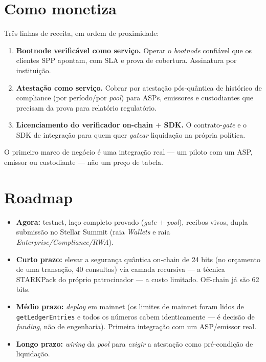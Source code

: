 \documentclass[11pt]{article}
\newcommand{\code}[1]{\texttt{\small #1}}
\begin{document}
\section{Como monetiza}

Três linhas de receita, em ordem de proximidade:

\begin{enumerate}[leftmargin=1.6em]
\item \textbf{Bootnode verificável como serviço.} Operar o \emph{bootnode}
confiável que os clientes SPP apontam, com SLA e prova de cobertura. Assinatura
por instituição.
\item \textbf{Atestação como serviço.} Cobrar por atestação pós-quântica de
histórico de compliance (por período/por \emph{pool}) para ASPs, emissores e
custodiantes que precisam da prova para relatório regulatório.
\item \textbf{Licenciamento do verificador on-chain $+$ SDK.} O contrato-\emph{gate}
e o SDK de integração para quem quer \emph{gatear} liquidação na própria política.
\end{enumerate}

O primeiro marco de negócio é uma integração real --- um piloto com um ASP,
emissor ou custodiante --- não um preço de tabela.

\section{Roadmap}

\begin{itemize}
\item \textbf{Agora:} testnet, laço completo provado (\emph{gate} $+$ \emph{pool}),
recibos vivos, dupla submissão no Stellar Summit (raia \emph{Wallets} e raia
\emph{Enterprise/Compliance/RWA}).
\item \textbf{Curto prazo:} elevar a segurança quântica on-chain de 24 bits (no
orçamento de uma transação, 40 consultas) via camada recursiva --- a técnica
STARKPack do próprio patrocinador --- a custo limitado. Off-chain já são 62 bits.
\item \textbf{Médio prazo:} \emph{deploy} em mainnet (os limites de mainnet foram
lidos de \code{getLedgerEntries} e todos os números cabem identicamente --- é
decisão de \emph{funding}, não de engenharia). Primeira integração com um
ASP/emissor real.
\item \textbf{Longo prazo:} \emph{wiring} da \emph{pool} para \emph{exigir} a
atestação como pré-condição de liquidação.
\end{itemize}
\end{document}
